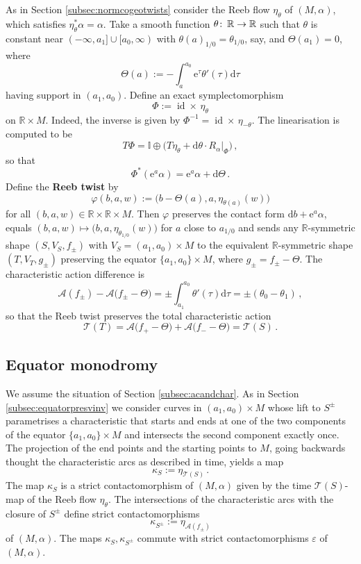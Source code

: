 \documentclass{amsart}
\theoremstyle{definition}
\def\co{\colon\thinspace}
\newcommand{\AAA}{\mathcal A}
\newcommand{\rmd}{\mathrm d}
\newcommand{\rme}{\mathrm e}
\newcommand{\R}{\mathbb R}
\newcommand{\TT}{\mathcal T}
\newcommand{\ra}{\rightarrow}
\DeclareMathOperator{\id}{\mathrm{id}}
\begin{document}
As in Section \ref{subsec:normcogeotwists}
consider the Reeb flow $\eta_{\theta}$ of $(M,\alpha)$,
which satisfies
$\eta_{\theta}^*\alpha=\alpha$.
Take a smooth function $\theta\co\R\ra\R$
such that $\theta$ is constant
near $(-\infty,a_1]\cup[a_0,\infty)$
with $\theta(a)_{1/0}=\theta_{1/0}$, say,
and $\Theta(a_1)=0$, where
  \[
  \Theta(a):=
  -\int_{a}^{a_0}\rme^{\tau}\theta'(\tau)\rmd\tau
  \]
having support in $(a_1,a_0)$.
Define an exact symplectomorphism
  \[
  \Phi:=\id\times\,\eta_{\theta}
  \]
on $\R\times M$.
Indeed, the inverse is given by
$\Phi^{-1}=\id\times\,\eta_{-\theta}$.
The linearisation is computed to be
  \[
  T\Phi=
  \mathbb{I}\oplus
  \Big(
  T\eta_{\theta}+
  \rmd\theta\cdot R_{\alpha}|_{\Phi}
  \Big)
  \,,
  \]
  so that
  \[
  \Phi^*(\rme^a\alpha)=
  \rme^a\alpha+\rmd\Theta
  \,.
  \]
Define the {\bf Reeb twist} by
  \[
  \varphi(b,a,w)
  :=\big(b-\Theta(a),a,\eta_{\theta(a)}(w)\big)
  \]
for all $(b,a,w)\in\R\times\R\times M$.
Then $\varphi$ preserves the contact form
$\rmd b+\rme^a\alpha$, equals
$(b,a,w)\mapsto\big(b,a,\eta_{\theta_{1/0}}(w)\big)$
for $a$ close to $a_{1/0}$ and
sends any $\R$-symmetric shape
$(S,V_S,f_{\pm})$ with $V_S=(a_1,a_0)\times M$
to the equivalent $\R$-symmetric shape $(T,V_T,g_{\pm})$
preserving the equator $\{a_1,a_0\}\times M$,
where $g_{\pm}=f_{\pm}-\Theta$.
The characteristic action difference is
  \[
  \AAA(f_{\pm})-\AAA\big(f_{\pm}-\Theta\big)
  =\pm\int_{a_1}^{a_0}\theta'(\tau)\rmd\tau
  =\pm(\theta_0-\theta_1)
  \,,
  \]
so that the Reeb twist
preserves the total characteristic action
\[
\TT(T)=
\AAA\big(f_+-\Theta\big)+
\AAA\big(f_--\Theta\big)=
\TT(S)
\,.
\]



\subsection{Equator monodromy}\label{subsec:eqmono}


We assume the situation of Section \ref{subsec:acandchar}.
As in Section \ref{subsec:equatorpresvinv}
we consider curves in $(a_1,a_0)\times M$
whose lift to $S^{\pm}$ parametrises a characteristic
that starts and ends at one of the two components
of the equator $\{a_1,a_0\}\times M$ and
intersects the second component exactly once.
The projection of the end points and the starting points to $M$,
going backwards thought the characteristic arcs as described
in time, yields a map
\[
\kappa_S:=
\eta_{\TT(S)}
\,.
\]
The map $\kappa_S$
is a strict contactomorphism
of $(M,\alpha)$ given by the time $\TT(S)$-map
of the Reeb flow $\eta_{\theta}$.
The intersections of the characteristic arcs
with the closure of $S^{\pm}$
define strict contactomorphisms
\[
\kappa_{S^{\pm}}:=
\eta_{\AAA(f_{\pm})}
\]
of $(M,\alpha)$.
The maps $\kappa_S, \kappa_{S^{\pm}}$
commute with strict contactomorphisms
$\varepsilon$ of $(M,\alpha)$.
\end{document}
